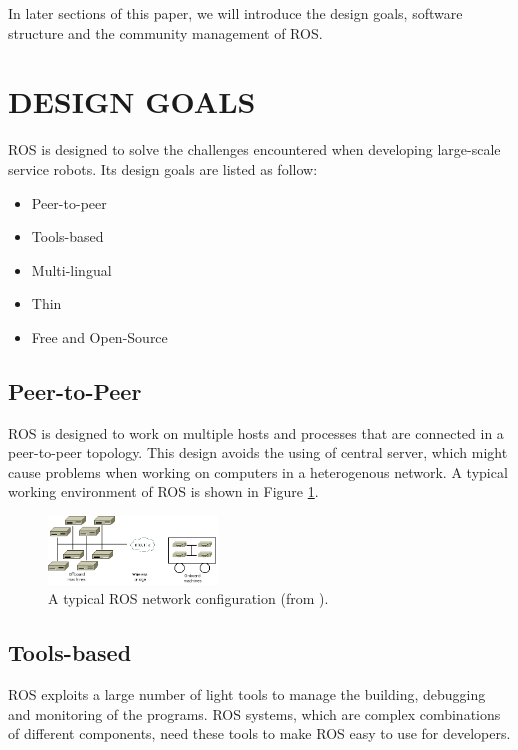 \documentclass[a4paper, 11pt, conference]{ieeeconf}       %
\begin{document}
In later sections of this paper, we will introduce the design goals, software structure and the community management of ROS. 

\section{DESIGN GOALS}

ROS is designed to solve the challenges encountered when developing large-scale service robots\cite{quigley_ros:_2009}. Its design goals are listed as follow:
\begin{itemize}
  \item Peer-to-peer
  \item Tools-based
  \item Multi-lingual
  \item Thin
  \item Free and Open-Source
\end{itemize}

\subsection{Peer-to-Peer}

ROS is designed to work on multiple hosts and processes that are connected in a peer-to-peer topology. This design avoids the using of central server, which might cause problems when working on computers in a heterogenous network. A typical working environment of ROS is shown in Figure \ref{fig:network}.

\begin{figure}[htpb]
  \centering
  \includegraphics[width=0.4\textwidth]{network}
  \caption{A typical ROS network configuration (from \cite{quigley_ros:_2009}).}
  \label{fig:network}
\end{figure}

\subsection{Tools-based} 

ROS exploits a large number of light tools to manage the building, debugging and monitoring of the programs. ROS systems, which are complex combinations of different components, need these tools to make ROS easy to use for developers.
\end{document}
